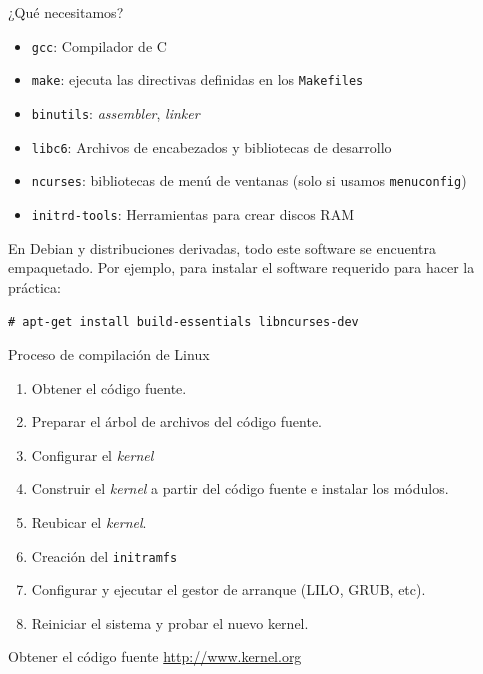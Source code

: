 \begin{frame}{¿Qué necesitamos?}
\begin{itemize}
\item \texttt{gcc}: Compilador de C

\item \texttt{make}: ejecuta las directivas definidas en los
  \texttt{Makefiles}
\item \texttt{binutils}: \textit{assembler}, \textit{linker}
\item \texttt{libc6}: Archivos de encabezados y bibliotecas de desarrollo
\item \texttt{ncurses}: bibliotecas de menú de ventanas (solo si usamos
  \texttt{menuconfig})
\item \texttt{initrd-tools}: Herramientas para crear discos RAM
\end{itemize}
\pause
\begin{block}{}
  En Debian y distribuciones derivadas, todo este software se encuentra
  empaquetado. Por ejemplo, para instalar el software requerido para hacer
  la práctica:

  \texttt{\# apt-get install build-essentials libncurses-dev}
\end{block}
\end{frame}

\begin{frame}{Proceso de compilación de Linux}
\begin{enumerate}
\item Obtener el código fuente.
\item Preparar el árbol de archivos del código fuente.
\item Configurar el \textit{kernel}
\item Construir el \textit{kernel} a partir del código fuente e instalar los
  módulos.
\item Reubicar el \textit{kernel}.
\item Creación del \texttt{initramfs}
\item Configurar y ejecutar el gestor de arranque (LILO, GRUB, etc).
\item Reiniciar el sistema y probar el nuevo kernel.
\end{enumerate}
\end{frame}

\begin{frame}{Obtener el código fuente}
  \large \url{http://www.kernel.org}
  \begin{center}
   \end{center}
\end{frame}

